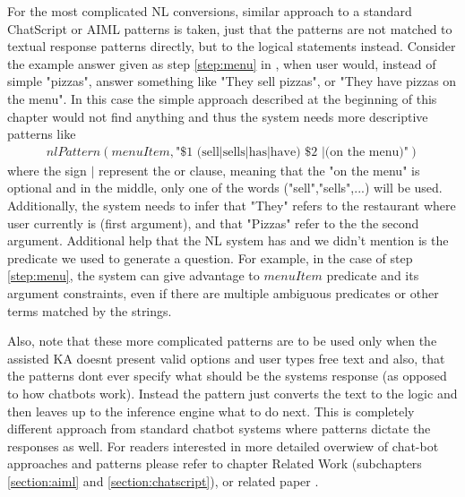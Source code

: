 For the most complicated NL conversions, similar approach to a standard 
ChatScript or AIML patterns\parencite{Wilcox2011,Wallace2013} is taken, just 
that the patterns are not matched to textual response patterns directly, but 
to the logical statements instead. Consider the example answer given as step 
\ref{step:menu} in \autocite{tab:conversation1}, when user would, instead of 
simple "pizzas", answer something like "They sell pizzas", or "They have 
pizzas on the menu". In this case the simple approach described at the 
beginning of this chapter would not find anything and thus the system needs 
more descriptive patterns like
\begin{equation}\label{nl:complexPattern}
\begin{gathered}
nlPattern(menuItem,\text{"\$1 (sell|sells|has|have) \$2 |(on the menu)"})
\end{gathered}
\end{equation}
where the sign $|$ represent the or clause, meaning that the "on the menu" is
optional and in the middle, only one of the words ("sell","sells",...) will
be used. Additionally, the system needs to infer that "They" refers to the
restaurant where user currently is (first argument), and that "Pizzas" refer 
to the the second argument.
Additional help that the NL system has and we didn't mention is the predicate
we used to generate a question. For example, in the case of step 
\ref{step:menu}, the system can give advantage to $menuItem$ predicate and its
argument constraints, even if there are multiple ambiguous predicates or other
terms matched by the strings.

Also, note that these more complicated patterns are to be used only when the 
assisted KA doesnt present valid options and user types free text and also, that
the patterns dont ever specify what should be the systems response (as opposed
to how chatbots work). Instead the pattern just converts the text to the logic
and then leaves up to the inference engine what to do next. This is completely 
different approach from standard chatbot systems where patterns dictate the 
responses as well. For readers interested in more detailed overwiew of chat-bot
approaches and patterns please refer to chapter Related Work (subchapters
\ref{section:aiml} and \ref{section:chatscript}), or related paper
\parencite{Bradesko2012}.

